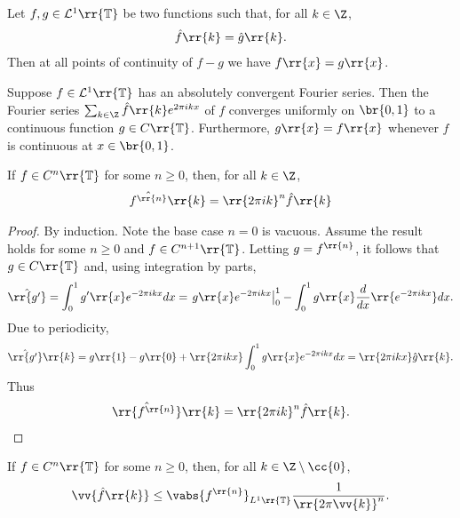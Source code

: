 \documentclass{article}
\begin{document}
\begin{theorem}
  Let $f,g\in\mathcal L^1\rr{\mathbb T}$ be two functions such that, for all $k\in\Z$,
  \begin{align*}
    \hat f\rr{k}=\hat g\rr{k}.
  \end{align*}
  Then at all points of continuity of $f-g$ we have $f\rr{x}=g\rr{x}$.
\end{theorem}

\begin{theorem}
  Suppose $f\in\mathcal L^1\rr{\mathbb T}$ has an absolutely convergent Fourier series.
  Then the Fourier series $\sum_{k\in\Z} \hat f\rr{k}e^{2\pi ikx}$ of $f$ converges uniformly
  on $\br{0,1}$ to a continuous function $g\in C\rr{\mathbb T}$. Furthermore, $g\rr{x}=f\rr{x}$
  whenever $f$ is continuous at $x\in\br{0,1}$.
\end{theorem}

\begin{proposition}
  If $f\in C^n\rr{\mathbb T}$ for some $n\geq 0$, then, for all $k\in\Z$,
  \begin{align*}
    \hat{f^{\rr{n}}}\rr{k}=\rr{2\pi ik}^n \hat f\rr{k}
  \end{align*}
  \begin{proof}
    By induction. Note the base case $n=0$ is vacuous. Assume the result holds for some
    $n\geq 0$ and $f\in C^{n+1}\rr{\mathbb T}$. Letting $g=f^{\rr{n}}$, it follows that
    $g\in C\rr{\mathbb T}$ and, using integration by parts,
    \begin{align*}
      \hat{\rr{g'}} = \int_0^1 g'\rr{x}e^{-2\pi ikx}dx
      = \left. g\rr{x}e^{-2\pi ikx}\right\rvert_0^1 - \int_0^1 g\rr{x}\frac{d}{dx}\rr{e^{-2\pi ikx}}dx.
    \end{align*}
    Due to periodicity,
    \begin{align*}
      \hat{\rr{g'}}\rr{k}= g\rr{1}-g\rr{0}+\rr{2\pi ikx}\int_0^1 g\rr{x}e^{-2\pi ikx}dx=\rr{2\pi ikx}\hat g\rr{k}.
    \end{align*}
    Thus
    \begin{align*}
      \hat{\rr{f^{\rr{n}}}}\rr{k}=\rr{2\pi ik}^n\hat f\rr{k}.
    \end{align*}
  \end{proof}
\end{proposition}

\begin{corollary}
  If $f\in C^n\rr{\mathbb T}$ for some $n\geq 0$, then, for all $k\in\Z\setminus\cc{0}$,
  \begin{align*}
    \vv{\hat f\rr{k}}\leq \vabs{f^{\rr{n}}}_{L^1\rr{\mathbb T}} \frac{1}{\rr{2\pi\vv{k}}^n}.
  \end{align*}
\end{corollary}
\end{document}
